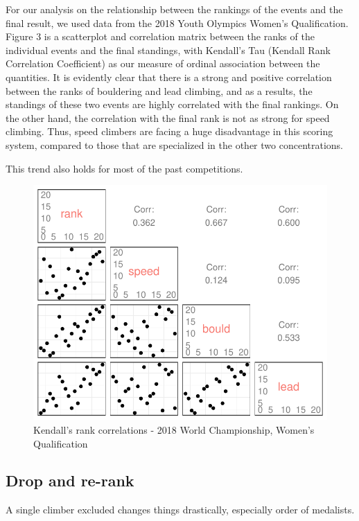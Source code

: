 \documentclass[12pt]{article}
\begin{document}
For our analysis on the relationship between the rankings of the events
and the final result, we used data from the 2018 Youth Olympics Women's
Qualification. Figure 3 is a scatterplot and correlation matrix between
the ranks of the individual events and the final standings, with
Kendall's Tau (Kendall Rank Correlation Coefficient) as our measure of
ordinal association between the quantities. It is evidently clear that
there is a strong and positive correlation between the ranks of
bouldering and lead climbing, and as a results, the standings of these
two events are highly correlated with the final rankings. On the other
hand, the correlation with the final rank is not as strong for speed
climbing. Thus, speed climbers are facing a huge disadvantage in this
scoring system, compared to those that are specialized in the other two
concentrations.

This trend also holds for most of the past competitions.

\begin{figure}[H]
\centering
\includegraphics{draft_files/figure-latex/unnamed-chunk-10-1.pdf}
\caption{Kendall's rank correlations - 2018 World Championship, Women's
Qualification}
\end{figure}

\hypertarget{drop-and-re-rank}{%
\subsection{Drop and re-rank}\label{drop-and-re-rank}}

A single climber excluded changes things drastically, especially order
of medalists.
\end{document}
